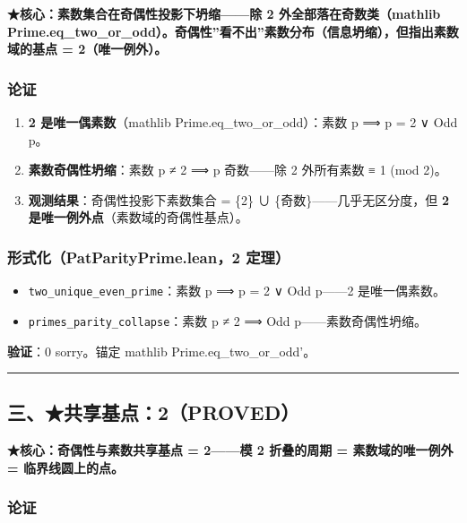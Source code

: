 \documentclass[
]{article}
\providecommand{\tightlist}{%
  \setlength{\itemsep}{0pt}\setlength{\parskip}{0pt}}
\begin{document}
\textbf{★核心：素数集合在奇偶性投影下坍缩------除 2
外全部落在奇数类（mathlib
Prime.eq\_two\_or\_odd）。奇偶性''看不出''素数分布（信息坍缩），但指出素数域的基点
= 2（唯一例外）。}

\subsubsection{论证}\label{ux8bbaux8bc1-1}

\begin{enumerate}
\def\labelenumi{\arabic{enumi}.}
\tightlist
\item
  \textbf{2 是唯一偶素数}（mathlib Prime.eq\_two\_or\_odd）：素数 p ⟹ p
  = 2 ∨ Odd p。
\item
  \textbf{素数奇偶性坍缩}：素数 p ≠ 2 ⟹ p 奇数------除 2 外所有素数 ≡ 1
  (mod 2)。
\item
  \textbf{观测结果}：奇偶性投影下素数集合 = \{2\} ∪
  \{奇数\}------几乎无区分度，但 \textbf{2
  是唯一例外点}（素数域的奇偶性基点）。
\end{enumerate}

\subsubsection{形式化（PatParityPrime.lean，2
定理）}\label{ux5f62ux5f0fux5316patparityprime.lean2-ux5b9aux7406}

\begin{itemize}
\tightlist
\item
  \texttt{two\_unique\_even\_prime}：素数 p ⟹ p = 2 ∨ Odd p------2
  是唯一偶素数。
\item
  \texttt{primes\_parity\_collapse}：素数 p ≠ 2 ⟹ Odd
  p------素数奇偶性坍缩。
\end{itemize}

\textbf{验证}：0 sorry。锚定 mathlib Prime.eq\_two\_or\_odd'。

\begin{center}\rule{0.5\linewidth}{0.5pt}\end{center}

\subsection{三、★共享基点：2（PROVED）}\label{ux4e09ux5171ux4eabux57faux70b92proved}

\textbf{★核心：奇偶性与素数共享基点 = 2------模 2 折叠的周期 =
素数域的唯一例外 = 临界线圆上的点。}

\subsubsection{论证}\label{ux8bbaux8bc1-2}
\end{document}
